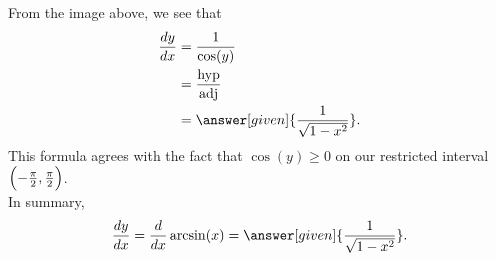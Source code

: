 \documentclass{ximera}
\begin{document}
\begin{theorem}
\begin{explanation}
%        
%        
%        
  From the image above, we see that 
  \begin{align*}
    \frac{dy}{dx} &= \frac{1}{\cos(y)}\\
    &=\frac{\mathrm{hyp}}{\mathrm{adj}}\\
    &= \answer[given]{\frac{1}{\sqrt{1-x^2}}}.
  \end{align*}
   This formula agrees with the fact that $\cos(y)\ge 0$ on our restricted interval $\Bigl(-\frac{\pi}{2},\frac{\pi}{2}\Bigr)$.\\
   
  In summary,
  \[
  \frac{dy}{dx} = \ddx \arcsin(x) = \answer[given]{\frac{1}{\sqrt{1-x^2}}}.
  \]
 
\end{explanation}
\end{theorem}
\end{document}
